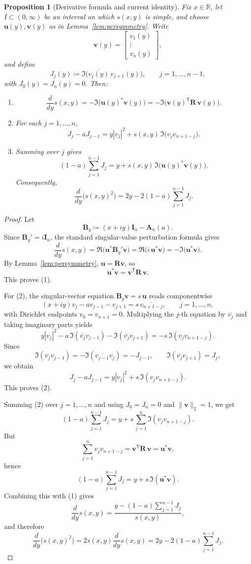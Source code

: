 \documentclass[11pt]{article}
\newtheorem{proposition}[theorem]{Proposition}
\begin{document}
\begin{proposition}[Derivative formula and current identity]\label{prop:current-identity}
Fix \(x\in\mathbb R\), let \(I\subset(0,\infty)\) be an interval on which \(s(x,y)\) is simple, and choose \(\mathbf u(y),\mathbf v(y)\) as in Lemma~\ref{lem:persymmetry}. Write
\[
\mathbf v(y)=
\begin{bmatrix}
v_1(y)\\
\vdots\\
v_n(y)
\end{bmatrix},
\]
and define
\[
J_j(y)\coloneqq \Im\!\bigl(\overline{v_j(y)}\,v_{j+1}(y)\bigr),
\qquad
j=1,\dots,n-1,
\]
with \(J_0(y)=J_n(y)=0\). Then:
\begin{enumerate}
\item
\[
\frac{d}{dy}s(x,y)
=
-\Im\!\bigl(\mathbf u(y)^*\mathbf v(y)\bigr)
=
-\Im\!\bigl(\mathbf v(y)^{\mathsf T}\mathbf R\,\mathbf v(y)\bigr).
\]
\item For each \(j=1,\dots,n\),
\[
J_j-aJ_{j-1}
=
y|v_j|^2+s(x,y)\,\Im\!\bigl(v_jv_{n+1-j}\bigr).
\]
\item Summing over \(j\) gives
\[
(1-a)\sum_{j=1}^{n-1}J_j
=
y+s(x,y)\,\Im\!\bigl(\mathbf u(y)^*\mathbf v(y)\bigr).
\]
Consequently,
\[
\frac{d}{dy}\bigl(s(x,y)^2\bigr)
=
2y-2(1-a)\sum_{j=1}^{n-1}J_j.
\]
\end{enumerate}
\end{proposition}

\begin{proof}
Let
\[
\mathbf B_y\coloneqq (x+iy)\mathbf I_n-\mathbf A_n(a).
\]
Since \(\mathbf B_y' = i\mathbf I_n\), the standard singular-value perturbation formula gives
\[
\frac{d}{dy}s(x,y)
=
\Re\!\bigl(\mathbf u^* \mathbf B_y' \mathbf v\bigr)
=
\Re\!\bigl(i\,\mathbf u^*\mathbf v\bigr)
=
-\Im\!\bigl(\mathbf u^*\mathbf v\bigr).
\]
By Lemma~\ref{lem:persymmetry}, \(\mathbf u=\mathbf R\overline{\mathbf v}\), so
\[
\mathbf u^*\mathbf v
=
\mathbf v^{\mathsf T}\mathbf R\,\mathbf v.
\]
This proves (1).

For (2), the singular-vector equation \(\mathbf B_y\mathbf v=s\,\mathbf u\) reads componentwise
\[
(x+iy)v_j-a v_{j-1}-v_{j+1}
=
s\,\overline{v_{n+1-j}},
\qquad
j=1,\dots,n,
\]
with Dirichlet endpoints \(v_0=v_{n+1}=0\). Multiplying the \(j\)-th equation by \(\overline{v_j}\) and taking imaginary parts yields
\[
y|v_j|^2-a\,\Im(\overline{v_j}v_{j-1})-\Im(\overline{v_j}v_{j+1})
=
-s\,\Im(v_jv_{n+1-j}).
\]
Since
\[
\Im(\overline{v_j}v_{j-1})=-\Im(\overline{v_{j-1}}v_j)=-J_{j-1},
\qquad
\Im(\overline{v_j}v_{j+1})=J_j,
\]
we obtain
\[
J_j-aJ_{j-1}
=
y|v_j|^2+s\,\Im(v_jv_{n+1-j}).
\]
This proves (2).

Summing (2) over \(j=1,\dots,n\) and using \(J_0=J_n=0\) and \(\|\mathbf v\|_2=1\), we get
\[
(1-a)\sum_{j=1}^{n-1}J_j
=
y+s\,\sum_{j=1}^n \Im(v_jv_{n+1-j}).
\]
But
\[
\sum_{j=1}^n v_jv_{n+1-j}
=
\mathbf v^{\mathsf T}\mathbf R\,\mathbf v
=
\mathbf u^*\mathbf v,
\]
hence
\[
(1-a)\sum_{j=1}^{n-1}J_j
=
y+s\,\Im(\mathbf u^*\mathbf v).
\]
Combining this with (1) gives
\[
\frac{d}{dy}s(x,y)
=
\frac{y-(1-a)\sum_{j=1}^{n-1}J_j}{s(x,y)},
\]
and therefore
\[
\frac{d}{dy}\bigl(s(x,y)^2\bigr)
=
2s(x,y)\frac{d}{dy}s(x,y)
=
2y-2(1-a)\sum_{j=1}^{n-1}J_j.
\]
\end{proof}
\end{document}
